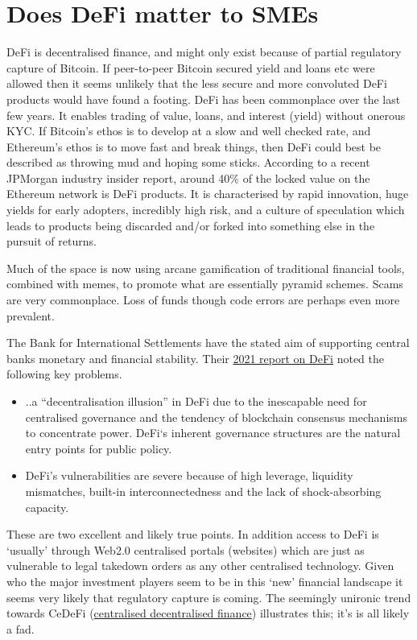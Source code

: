 \section{Does DeFi matter to SMEs }
DeFi is decentralised finance, and might only exist because of partial regulatory capture of Bitcoin. If peer-to-peer Bitcoin secured yield and loans etc were allowed then it seems unlikely that the less secure and more convoluted DeFi products would have found a footing. DeFi  has been commonplace over the last few years. It enables trading of value, loans, and interest (yield) without onerous KYC. If Bitcoin's ethos is to develop at a slow and well checked rate, and Ethereum's ethos is to move fast and break things, then DeFi could best be described as throwing mud and hoping some sticks. According to a recent JPMorgan industry insider report, around 40\% of the locked value on the Ethereum network is DeFi products. It is characterised by rapid innovation, huge yields for early adopters, incredibly high risk, and a culture of speculation which leads to products being discarded and/or forked into something else in the pursuit of returns.\par 
Much of the space is now using arcane gamification of traditional financial tools, combined with memes, to promote what are essentially pyramid schemes. Scams are very commonplace. Loss of funds though code errors are perhaps even more prevalent.\par
The Bank for International Settlements have the stated aim of supporting central banks monetary and financial stability. Their \href{https://www.bis.org/publ/qtrpdf/r_qt2112b.pdf}{2021 report on DeFi} noted the following key problems.
\begin{itemize}
\item ..a ``decentralisation illusion'' in DeFi due to the inescapable need for centralised governance and the tendency of blockchain consensus mechanisms to concentrate power. DeFi`s inherent governance structures are the natural entry points for public policy.
\item DeFi’s vulnerabilities are severe because of high leverage, liquidity mismatches, built-in interconnectedness and the lack of shock-absorbing capacity.
\end{itemize}
These are two excellent and likely true points. In addition access to DeFi is `usually' through Web2.0 centralised portals (websites) which are just as vulnerable to legal takedown orders as any other centralised technology. Given who the major investment players seem to be in this `new' financial landscape it seems very likely that regulatory capture is coming. The seemingly unironic trend towards CeDeFi (\href{https://www.nasdaq.com/articles/cedefi-what-it-is-and-why-it-matters}{centralised decentralised finance}) illustrates this; it's is all likely a fad.\par

